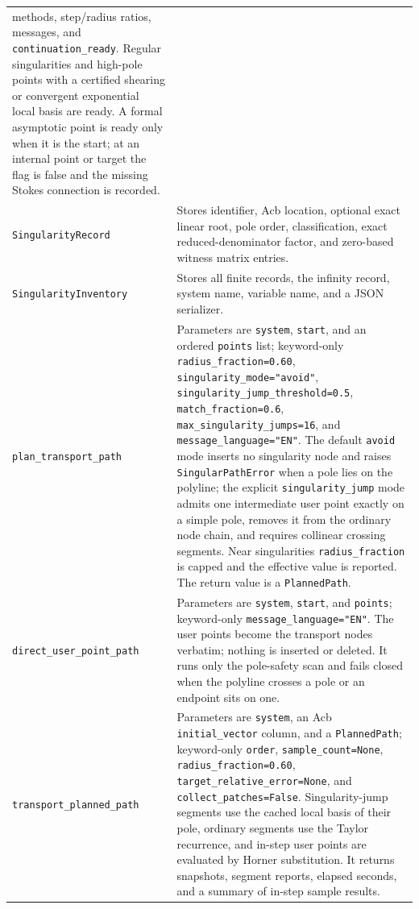 \documentclass[11pt]{article}
\begin{document}
\begin{longtable}{L{0.36\textwidth}L{0.58\textwidth}}
methods, step/radius ratios, messages, and \texttt{continuation\_ready}.  Regular singularities
and high-pole points with a certified shearing or convergent exponential local basis are
ready.  A formal asymptotic point is ready only when it is the start; at an internal point or
target the flag is false and the missing Stokes connection is recorded. \\
\texttt{SingularityRecord} & Stores identifier, Acb location, optional exact linear root,
pole order, classification, exact reduced-denominator factor, and zero-based witness matrix
entries. \\
\texttt{SingularityInventory} & Stores all finite records, the infinity record, system name,
variable name, and a JSON serializer. \\
\texttt{plan\_transport\_path} & Parameters are \texttt{system}, \texttt{start}, and an
ordered \texttt{points} list; keyword-only \texttt{radius\_fraction=0.60},
\texttt{singularity\_mode="avoid"}, \texttt{singularity\_jump\_threshold=0.5},
\texttt{match\_fraction=0.6}, \texttt{max\_singularity\_jumps=16}, and
\texttt{message\_language="EN"}.  The default \texttt{avoid} mode inserts no singularity
node and raises \texttt{SingularPathError} when a pole lies on the polyline; the explicit
\texttt{singularity\_jump} mode admits one intermediate user point exactly on a simple pole,
removes it from the ordinary node chain, and requires collinear crossing segments.  Near
singularities \texttt{radius\_fraction} is capped and the effective value is reported.  The
return value is a \texttt{PlannedPath}. \\
\texttt{direct\_user\_point\_path} & Parameters are \texttt{system}, \texttt{start}, and
\texttt{points}; keyword-only \texttt{message\_language="EN"}.  The user points become the
transport nodes verbatim; nothing is inserted or deleted.  It runs only the pole-safety scan
and fails closed when the polyline crosses a pole or an endpoint sits on one. \\
\texttt{transport\_planned\_path} & Parameters are \texttt{system}, an Acb
\texttt{initial\_vector} column, and a \texttt{PlannedPath}; keyword-only \texttt{order},
\texttt{sample\_count=None}, \texttt{radius\_fraction=0.60},
\texttt{target\_relative\_error=None}, and \texttt{collect\_patches=False}.  Singularity-jump
segments use the cached local basis of their pole, ordinary segments use the Taylor
recurrence, and in-step user points are evaluated by Horner substitution.  It returns
snapshots, segment reports, elapsed seconds, and a summary of in-step sample results. \\

\end{longtable}
\end{document}
